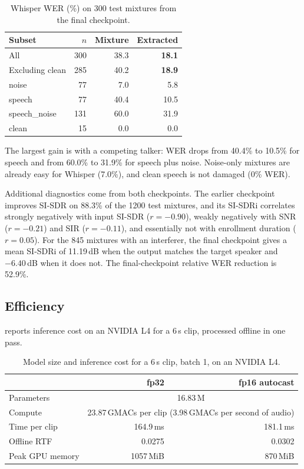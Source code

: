 \documentclass[11pt,a4paper]{article}
\newcommand{\sisdr}{SI-SDR}
\newcommand{\sisdri}{SI-SDRi}
\begin{document}
\begin{table}[htbp]
\centering\small
\caption{Whisper WER (\%) on 300 test mixtures from the final checkpoint.}
\label{tab:wer}
\begin{tabular}{@{}lrrr@{}}
\toprule
Subset & $n$ & Mixture & Extracted\\
\midrule
All & 300 & 38.3 & \textbf{18.1}\\
Excluding clean & 285 & 40.2 & \textbf{18.9}\\
\midrule
noise & 77 & 7.0 & 5.8\\
speech & 77 & 40.4 & 10.5\\
speech\_noise & 131 & 60.0 & 31.9\\
clean & 15 & 0.0 & 0.0\\
\bottomrule
\end{tabular}
\end{table}

The largest gain is with a competing talker: WER drops from 40.4\% to 10.5\% for speech and from
60.0\% to 31.9\% for speech plus noise. Noise-only mixtures are already easy for Whisper (7.0\%),
and clean speech is not damaged (0\% WER).

Additional diagnostics come from both checkpoints. The earlier checkpoint improves \sisdr{} on
88.3\% of the 1200 test mixtures, and its \sisdri{} correlates strongly negatively with input
\sisdr{} ($r=-0.90$), weakly negatively with SNR ($r=-0.21$) and SIR ($r=-0.11$), and essentially
not with enrollment duration ($r=0.05$). For the 845 mixtures with an interferer, the final
checkpoint gives a mean \sisdri{} of 11.19\,dB when the output matches the target speaker and
$-6.40$\,dB when it does not. The final-checkpoint relative WER reduction is 52.9\%.

\subsection{Efficiency}
\label{sec:eff}
 reports inference cost on an NVIDIA L4 for a 6\,s clip, processed offline in one
pass.

\begin{table}[htbp]
\centering\small
\caption{Model size and inference cost for a 6\,s clip, batch 1, on an NVIDIA L4.}
\label{tab:eff}
\begin{tabular}{@{}lrr@{}}
\toprule
 & fp32 & fp16 autocast\\
\midrule
Parameters & \multicolumn{2}{c}{16.83\,M}\\
Compute & \multicolumn{2}{c}{23.87\,GMACs per clip (3.98\,GMACs per second of audio)}\\
Time per clip & 164.9\,ms & 181.1\,ms\\
Offline RTF & 0.0275 & 0.0302\\
Peak GPU memory & 1057\,MiB & 870\,MiB\\
\bottomrule
\end{tabular}
\end{table}
\end{document}
